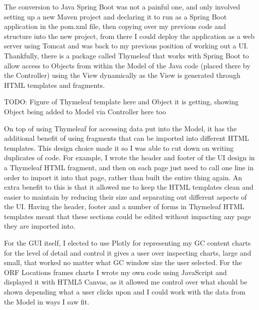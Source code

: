 The conversion to Java Spring Boot was not a painful one, and only involved setting up a new Maven project and declaring it to run as a Spring Boot application in the pom.xml file, then copying over my previous code and structure into the new project, from there I could deploy the application as a web server using Tomcat and was back to my previous position of working out a UI. Thankfully, there is a package called Thymeleaf\cite{thymeleaf} that works with Spring Boot to allow access to Objects from within the Model of the Java code (placed there by the Controller) using the View dynamically as the View is generated through HTML templates and fragments.

TODO: Figure of Thymeleaf template here and Object it is getting, showing Object being added to Model via Controller here too

On top of using Thymeleaf for accessing data put into the Model, it has the additional benefit of using fragments that can be imported into different HTML templates. This design choice made it so I was able to cut down on writing duplicates of code. For example, I wrote the header and footer of the UI design in a Thymeleaf HTML fragment, and then on each page just need to call one line in order to import it into that page, rather than built the entire thing again. An extra benefit to this is that it allowed me to keep the HTML templates clean and easier to maintain by reducing their size and separating out different aspects of the UI. Having the header, footer and a number of forms in Thymeleaf HTML templates meant that these sections could be edited without impacting any page they are imported into.

For the GUI itself, I elected to use Plotly for representing my GC content charts for the level of detail and control it gives a user over inspecting charts, large and small, that worked no matter what GC window size the user selected. For the ORF Locations frames charts I wrote my own code using JavaScript and displayed it with HTML5 Canvas, as it allowed me control over what should be shown depending what a user clicks upon and I could work with the data from the Model in ways I saw fit.


